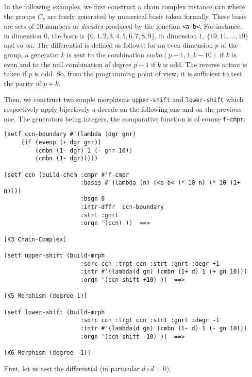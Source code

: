 In the following examples, we first construct a chain complex instance {\tt ccn}
where the groups $C_p$ are freely generated by numerical basis taken formally.
These basis are sets of $10$ numbers or {\em decades} produced by the fonction {\tt <a-b<}.
For instance, in dimension $0$, the basis is $\lbrace 0,1,2,3,4,5,6,7,8,9 \rbrace$,
in dimension $1$, $\lbrace 10,11,\ldots,19 \rbrace$ and so on.
The differential is defined as follows: for an even dimension $p$ of the group,
a generator $k$ is sent to the combination $cmbn (p-1, 1, k-10)$ if $k$ is even
and to the null combination of degree $p-1$ if $k$ is odd. The reverse action
is taken if $p$ is odd. So, from the programming point of view, it is sufficient to test the
parity of $p+k$.\par
Then, we construct two simple morphisms {\tt upper-shift} and {\tt lower-shift} which
respectively apply bijectively a decade on the following one and on the previous one.
The generators being integers,  the comparative function is of course {\tt f-cmpr}.
{\footnotesize\begin{verbatim}
(setf ccn-boundary #'(lambda (dgr gnr)
     (if (evenp (+ dgr gnr))
         (cmbn (1- dgr) 1 (- gnr 10))
         (cmbn (1- dgr)))))

(setf ccn (build-chcm :cmpr #'f-cmpr
                      :basis #'(lambda (n) (<a-b< (* 10 n) (* 10 (1+ n))))
                      :bsgn 0
                      :intr-dffr  ccn-boundary
                      :strt :gnrt
                      :orgn '(ccn) ))  ==>

[K3 Chain-Complex]

(setf upper-shift (build-mrph
                      :sorc ccn :trgt ccn :strt :gnrt :degr +1
                      :intr #'(lambda(d gn) (cmbn (1+ d) 1 (+ gn 10)))
                      :orgn '(ccn shift +10) ))  ==>

[K5 Morphism (degree 1)]

(setf lower-shift (build-mrph
                      :sorc ccn :trgt ccn :strt :gnrt :degr -1
                      :intr #'(lambda(d gn) (cmbn (1- d) 1 (- gn 10)))
                      :orgn '(ccn shift -10) ))  ==>

[K6 Morphism (degree -1)]
\end{verbatim}}
First, let us test the differential (in particular $d \circ d =0$).
